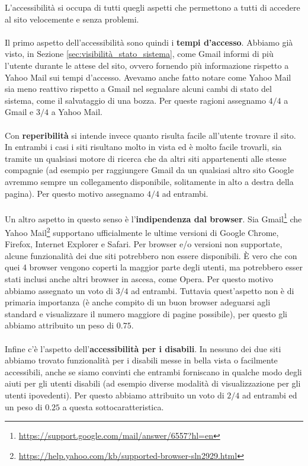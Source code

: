 		L'accessibilità si occupa di tutti quegli aspetti che permettono a tutti di accedere al sito velocemente e senza problemi.\\
		\\
		Il primo aspetto dell'accessibilità sono quindi i \textbf{tempi d'accesso}. Abbiamo già visto,  in Sezione \ref{sec:visibilità_stato_sistema}, come Gmail informi di più  l'utente durante le attese del sito, ovvero fornendo più informazione rispetto a Yahoo Mail sui tempi d'accesso. Avevamo anche fatto notare come Yahoo Mail sia meno reattivo rispetto a Gmail nel segnalare alcuni cambi di stato del sistema, come il salvataggio di una bozza. Per queste ragioni assegnamo $4/4$ a Gmail e $3/4$ a Yahoo Mail.\\
		\\
		Con \textbf{reperibilità} si intende invece quanto risulta facile all'utente trovare il sito. In entrambi i casi i siti risultano molto in vista ed è molto facile trovarli, sia tramite un qualsiasi motore di ricerca che da altri siti appartenenti alle stesse compagnie (ad esempio per raggiungere Gmail da un qualsiasi altro sito Google avremmo sempre un collegamento disponibile, solitamente in alto a destra della pagina). Per questo motivo assegnamo $4/4$ ad entrambi.\\
		\\
		Un altro aspetto in questo senso è l'\textbf{indipendenza dal browser}. Sia Gmail\footnote{\url{https://support.google.com/mail/answer/6557?hl=en}} che Yahoo Mail\footnote{\url{https://help.yahoo.com/kb/supported-browser-sln2929.html}} supportano ufficialmente le ultime versioni di Google Chrome, Firefox, Internet Explorer e Safari. Per browser e/o versioni non supportate, alcune funzionalità dei due siti potrebbero non essere disponibili. È vero che con quei 4 browser vengono coperti la maggior parte degli utenti, ma potrebbero esser stati  inclusi anche altri browser in ascesa, come Opera. Per questo motivo abbiamo assegnato un voto di $3/4$ ad entrambi. Tuttavia quest'aspetto non è di primaria importanza (è anche compito di un buon browser adeguarsi agli standard e visualizzare il numero maggiore di pagine possibile), per questo gli abbiamo attribuito un peso di $0.75$.\\
		\\
		Infine c'è l'aspetto dell'\textbf{accessibilità per i disabili}. In nessuno dei due siti abbiamo trovato funzionalità  per i disabili messe in bella vista o facilmente accessibili, anche se siamo convinti che entrambi forniscano in qualche modo degli aiuti per gli utenti disabili (ad esempio diverse modalità di visualizzazione per gli utenti ipovedenti). Per questo abbiamo attribuito un voto di $2/4$ ad entrambi ed un peso di $0.25$ a questa sottocaratteristica.
	
